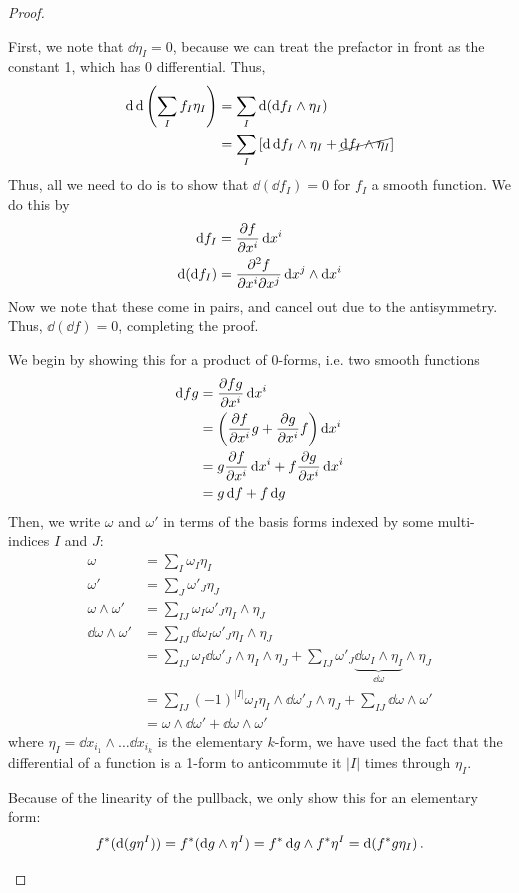 \begin{proof}
	\begin{parts}
		\item First, we note that $\dd{\eta_I}=0$, because we can treat the prefactor in front as the constant 1, which has 0 differential. Thus,
		\begin{align*}
			\dd{\dd{\left( \sum_I f_I \eta_I \right)}} &= \sum_I \dd{(\dd{f_I}\wedge\eta_I)} \\
			&= \sum_I \left[ \dd{\dd{f_I}}\wedge \eta_I + \cancel{\dd{f_I}\wedge\eta_I} \right]  
		\end{align*}
		Thus, all we need to do is to show that $\dd{(\dd{f_I})}=0$ for $f_I$ a smooth function. We do this by
		\begin{align*}
			\dd{f_I} &= \pdv{f}{x^i}\dd{x^i} \\
			\dd{(\dd{f_I})} &= \pdv{f}{x^i}{x^j}\dd{x^j}\wedge\dd{x^i}
		\end{align*}
		Now we note that these come in pairs, and cancel out due to the antisymmetry. Thus, $\dd{(\dd{f})}=0$, completing the proof.
				\item We begin by showing this for a product of 0-forms, i.e. two smooth functions
		\begin{align*}
			\dd{fg} &= \pdv{fg}{x^i} \dd{x^i} \\
			&= \left( \pdv{f}{x^i}g + \pdv{g}{x^i}f \right)\dd{x^i} \\
			&= g \pdv{f}{x^i}\dd{x^i} + f\pdv{g}{x^i}\dd{x^i} \\
			&= g\dd{f} + f\dd{g} 
		\end{align*}
		Then, we write $\omega$ and $\omega'$ in terms of the basis forms indexed by some multi-indices $I$ and $J$:
		\begin{align*}
			\omega &= \sum_I \omega_I \eta_I \\
			\omega' &= \sum_J \omega'_J \eta_J \\
			\omega\wedge\omega' &= \sum_{IJ} \omega_I \omega'_J \eta_I\wedge\eta_J \\
			\dd{\omega\wedge\omega'} &= \sum_{IJ} \dd{\omega_I \omega'_J} \eta_I\wedge\eta_J \\
			&= \sum_{IJ} \omega_I \dd{\omega'_J} \wedge\eta_I\wedge\eta_J + \sum_{IJ}\omega'_J \underbrace{\dd{\omega_I} \wedge\eta_I}_{\dd{\omega}}\wedge\eta_J \\
			&= \sum_{IJ}(-1)^{|I|}  \omega_I \eta_I \wedge \dd{\omega'_J} \wedge \eta_J + \sum_{IJ} \dd{\omega}\wedge \omega' \\
			&= \omega\wedge\dd{\omega'}+\dd{\omega}\wedge\omega' 
		\end{align*}
		where $\eta_I = \dd{x_{i_1}}\wedge \dots \dd{x_{i_k}}$ is the elementary $k$-form, we have used the fact that the differential of a function is a 1-form to anticommute it $|I|$ times through $\eta_I$.
		\item Because of the linearity of the pullback, we only show this for an elementary form:
		\[
		f^*(\dd{(g \eta^I)}) = f^*(\dd{g}\wedge \eta^I)= f^*\dd{g} \wedge f^*\eta^I = \dd{(f^* g \eta_I)}
		.\qedhere\] 
	\end{parts}
\end{proof}

